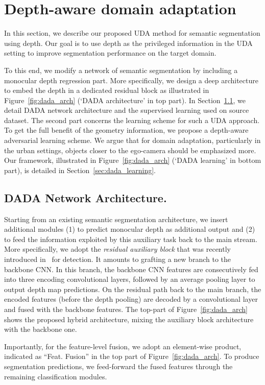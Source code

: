 \documentclass[10pt,twocolumn,letterpaper]{article}
\begin{document}
	\section{Depth-aware domain adaptation}
	In this section, we describe our proposed UDA method for semantic segmentation using depth.
Our goal is to use depth as the privileged information in the UDA setting to improve segmentation performance on the target domain.

To this end, we modify a network of semantic segmentation by including a monocular depth regression part.
More specifically, we  design a deep architecture to embed the depth in a dedicated residual block as illustrated in Figure~\ref{fig:dada_arch} (`DADA architecture' in top part). In Section~\ref{sec:dada_arch}, we detail DADA network architecture and the supervised learning used on source dataset.
The second part concerns the learning scheme for such a UDA approach. To get the full benefit of the geometry information, we propose a depth-aware adversarial learning scheme.
We argue that for domain adaptation, particularly in the urban settings, objects closer to the ego-camera should be emphasized more.
Our framework, illustrated in Figure~\ref{fig:dada_arch} (`DADA learning' in bottom part), is detailed in Section~\ref{sec:dada_learning}.


\subsection{DADA Network Architecture.}\label{sec:dada_arch}

Starting from an existing semantic segmentation architecture, we insert additional modules (1) to predict monocular depth as additional output and (2) to feed the information exploited by this auxiliary task back to the main stream.
More specifically, we adopt the \textit{residual auxiliary block} that was recently introduced in~\cite{mordan2018revisiting} for detection.
It amounts to grafting a new branch to the backbone CNN.
In this branch, the backbone CNN features are consecutively fed into three encoding convolutional layers, followed by an average pooling layer to output depth map predictions.
On the residual path back to the main branch, the encoded features (before the depth pooling) are decoded by a convolutional layer and fused with the backbone features.
The top-part of Figure~\ref{fig:dada_arch} shows the proposed hybrid architecture, mixing the auxiliary block architecture with the backbone one.

Importantly, for the feature-level fusion, we adopt an element-wise product, indicated as ``Feat. Fusion'' in the top part of Figure~\ref{fig:dada_arch}. To produce segmentation predictions, we feed-forward the fused features through the remaining classification modules.
\end{document}

